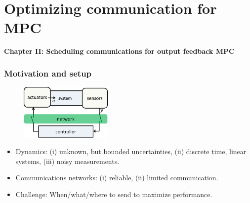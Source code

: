 \documentclass{beamer}
\begin{document}
\section{Optimizing communication for MPC}
\begin{frame}
\centerline{\textbf{Chapter II: Scheduling communications for output feedback MPC}
}
\end{frame}
\begin{frame}
 \frametitle{Motivation and setup}
 \begin{figure}
\centering
\includegraphics[width=0.4\textwidth ]{clc.png}
\end{figure}
 \begin{itemize}
  \item Dynamics: (i) unknown, but bounded uncertainties, (ii) discrete time, linear systems, (iii) noisy measurements.
  \item Communications networks: (i) reliable, (ii) limited communication. %
  \item Challenge: When/what/where to send to maximize  performance.
 \end{itemize}
\end{frame}
\end{document}
